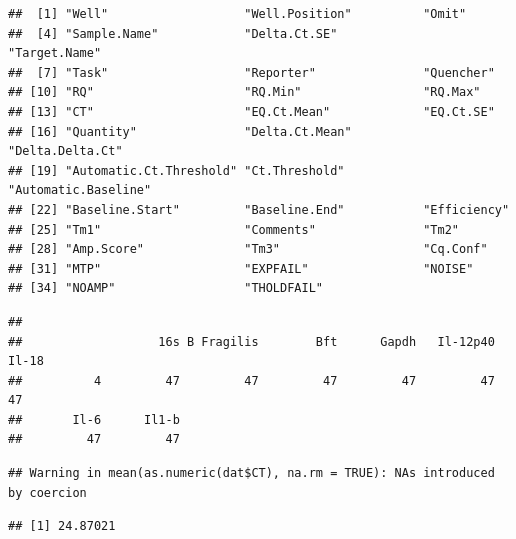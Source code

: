 \documentclass[
]{book}
\newenvironment{Shaded}{\begin{snugshade}}{\end{snugshade}}
\newcommand{\AttributeTok}[1]{\textcolor[rgb]{0.77,0.63,0.00}{#1}}
\newcommand{\CommentTok}[1]{\textcolor[rgb]{0.56,0.35,0.01}{\textit{#1}}}
\newcommand{\ConstantTok}[1]{\textcolor[rgb]{0.00,0.00,0.00}{#1}}
\newcommand{\FunctionTok}[1]{\textcolor[rgb]{0.00,0.00,0.00}{#1}}
\newcommand{\NormalTok}[1]{#1}
\newcommand{\SpecialCharTok}[1]{\textcolor[rgb]{0.00,0.00,0.00}{#1}}
\begin{document}
\begin{verbatim}
##  [1] "Well"                   "Well.Position"          "Omit"                  
##  [4] "Sample.Name"            "Delta.Ct.SE"            "Target.Name"           
##  [7] "Task"                   "Reporter"               "Quencher"              
## [10] "RQ"                     "RQ.Min"                 "RQ.Max"                
## [13] "CT"                     "EQ.Ct.Mean"             "EQ.Ct.SE"              
## [16] "Quantity"               "Delta.Ct.Mean"          "Delta.Delta.Ct"        
## [19] "Automatic.Ct.Threshold" "Ct.Threshold"           "Automatic.Baseline"    
## [22] "Baseline.Start"         "Baseline.End"           "Efficiency"            
## [25] "Tm1"                    "Comments"               "Tm2"                   
## [28] "Amp.Score"              "Tm3"                    "Cq.Conf"               
## [31] "MTP"                    "EXPFAIL"                "NOISE"                 
## [34] "NOAMP"                  "THOLDFAIL"
\end{verbatim}

\begin{Shaded}
\end{Shaded}

\begin{verbatim}
## 
##                   16s B Fragilis        Bft      Gapdh   Il-12p40      Il-18 
##          4         47         47         47         47         47         47 
##       Il-6      Il1-b 
##         47         47
\end{verbatim}

\begin{Shaded}
\end{Shaded}

\begin{verbatim}
## Warning in mean(as.numeric(dat$CT), na.rm = TRUE): NAs introduced by coercion
\end{verbatim}

\begin{verbatim}
## [1] 24.87021
\end{verbatim}
\end{document}
